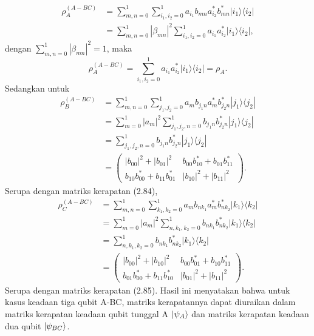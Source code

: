 \begin{align*}
	\rho_{A}^{(A-BC)} 
	&= \sum_{m,n=0}^{1} \sum_{i_1,i_2=0}^{1} a_{i_1}b_{mn} a^{*}_{i_2}b^{*}_{mn}|i_1\rangle \langle i_2| \\
	&= \sum_{m,n=0}^{1} |\beta_{mn}|^2 \sum_{i_1,i_2=0}^{1} a_{i_1} a^{*}_{i_2}|i_1\rangle \langle i_2|,
\end{align*}
dengan $\sum_{m,n=0}^{1}|\beta_{mn}|^2=1$, maka
\begin{equation}
	\rho_{A}^{(A-BC)} = \sum_{i_1,i_2=0}^{1} a_{i_1} a^{*}_{i_2}|i_1\rangle \langle i_2|=\rho_A.
\end{equation}
Sedangkan untuk
\begin{equation}
	\begin{aligned}
		\rho_{B}^{(A-BC)} 
		&= \sum_{m,n=0}^{1} \sum_{j_1,j_2=0}^{1}a_m b_{j_1 n}a^{*}_m b^{*}_{j_2 n}|j_1\rangle \langle j_2|\\
		&=\sum_{m=0}^{1} |a_m|^2 \sum_{j_1,j_2,n=0}^{1} b_{j_1 n} b^{*}_{j_2 n}|j_1\rangle \langle j_2|\\
		&= \sum_{j_1,j_2,n=0}^{1} b_{j_1 n} b^{*}_{j_2 n}|j_1\rangle \langle j_2|\\
		&=
		\begin{pmatrix}
			|b_{00}|^2+|b_{01}|^2&b_{00}b_{10}^*+b_{01}b_{11}^*\\
			b_{10}b_{00}^*+b_{11}b_{01}^*&|b_{10}|^2+|b_{11}|^2
		\end{pmatrix}.
	\end{aligned}
\end{equation}
Serupa dengan matriks kerapatan (2.84),
\begin{equation}
	\begin{aligned}
		\rho_{C}^{(A-BC)} 
		&= \sum_{m,n=0}^{1} \sum_{k_1,k_2=0}^{1}a_m b_{n k_1}a^{*}_m b^{*}_{n k_2}|k_1\rangle \langle k_2|\\
		&=\sum_{m=0}^{1} |a_m|^2 \sum_{n,k_1,k_2=0}^{1} b_{n k_1} b^{*}_{n k_2}|k_1\rangle \langle k_2|\\
		&= \sum_{n,k_1,k_2=0}^{1} b_{n k_1} b^{*}_{n k_2}|k_1\rangle \langle k_2|\\
		&=
		\begin{pmatrix}
			|b_{00}|^2+|b_{10}|^2&b_{00}b_{01}^*+b_{10}b_{11}^*\\
			b_{01}b_{00}^*+b_{11}b_{10}^*&|b_{01}|^2+|b_{11}|^2
		\end{pmatrix}.
	\end{aligned}
\end{equation}
Serupa dengan matriks kerapatan (2.85). Hasil ini menyatakan bahwa untuk kasus keadaan tiga qubit A-BC, matriks kerapatannya dapat diuraikan dalam matriks kerapatan keadaan qubit tunggal A $\ket{\psi_{A}}$ dan matriks kerapatan keadaan dua qubit $\ket{\psi_{BC}}$.
